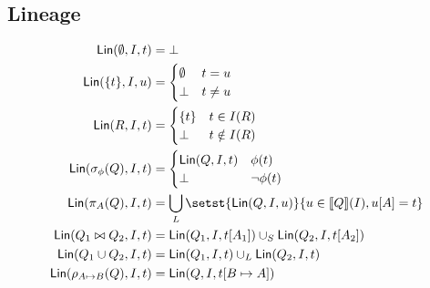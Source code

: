 \documentclass{mwhittaker}
\begin{document}
\subsection{Lineage}
\begin{align*}
  \Lineage(\emptyset, I, t) &= \bot \\
  \Lineage(\set{t}, I, u) &= \begin{cases}
    \emptyset & t = u \\
    \bot & t \neq u
  \end{cases} \\
  \Lineage(R, I, t) &= \begin{cases}
    \set{t} & t \in I(R) \\
    \bot & t \notin I(R)
  \end{cases} \\
  \Lineage(\select_\phi(Q), I, t) &= \begin{cases}
    \Lineage(Q, I, t) & \phi(t) \\
    \bot & \lnot \phi(t)
  \end{cases} \\
  \Lineage(\project_A(Q), I, t) &= \bigcup_L \setst{\Lineage(Q, I, u)}{u \in \denote{Q}(I), u[A] = t} \\
  \Lineage(Q_1 \join Q_2, I, t) &= \Lineage(Q_1, I, t[A_1]) \cup_S \Lineage(Q_2, I, t[A_2]) \\
  \Lineage(Q_1 \cup Q_2, I, t) &= \Lineage(Q_1, I, t) \cup_L \Lineage(Q_2, I, t) \\
  \Lineage(\rename_{A \mapsto B}(Q), I, t) &= \Lineage(Q, I, t[B \mapsto A])
\end{align*}
\end{document}
